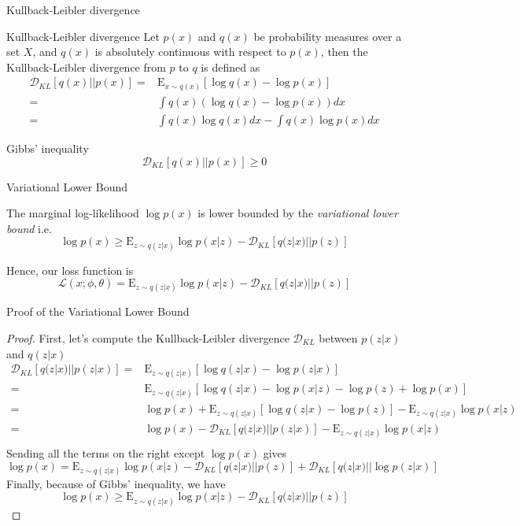 \documentclass{beamer}
\newcommand{\kldiv}{\mathcal{D}_{KL}}
\newcommand{\E}{\mathrm{E}}
\begin{document}
\begin{frame}{Kullback-Leibler divergence}

	\begin{block}{Kullback-Leibler divergence}
		Let $p(x)$ and $q(x)$ be probability measures over a set $X$, and $q(x)$ is absolutely continuous with respect to $p(x)$, then the Kullback-Leibler divergence from $p$ to $q$ is defined as
		\begin{equation*}
			\begin{split}
			\kldiv[q(x)||p(x)] 
			=& \E_{x\sim q(x)}[ \log q(x) - \log p(x)]\\
			=& \int q(x)(\log q(x)-\log p(x))dx\\
			=& \int q(x)\log q(x)dx-\int q(x)\log p(x)dx
			\end{split}
		\end{equation*}
	\end{block}
	\begin{block}{Gibbs' inequality}
		\begin{equation*}
			\kldiv[q(x)||p(x)] \geq 0
		\end{equation*} 
	\end{block}
\end{frame}

\begin{frame}{Variational Lower Bound}
	\begin{corollary}
		The marginal log-likelihood $\log p(x)$ is lower bounded by the \textit{variational lower bound} i.e.
		\[
			\log p(x)  \geq \E_{z\sim q(z|x)}\log p(x|z)- \kldiv[q(z|x)||p(z)]
		\]
	\end{corollary}
	Hence, our loss function is
	\Large
	\[
		\mathcal{L}(x;\phi, \theta) = \E_{z\sim q(z|x)}\log p(x|z)- \kldiv[q(z|x)||p(z)]
	\] 
\end{frame} 

\begin{frame}{Proof of the Variational Lower Bound}
	\begin{proof}
		\scriptsize
		First, let's compute the Kullback-Leibler divergence $\kldiv$ between $p(z|x)$ and $q(z|x)$
		\begin{equation*}
		\begin{split}
		\kldiv[q(z|x)||p(z|x)] 
		=& \E_{z\sim q(z|x)}[ \log q(z|x) - \log p(z|x)]\\
		=& \E_{z\sim q(z|x)}[ \log q(z|x) - \log p(x|z) - \log p(z) + \log p(x)]\\
		=& \log p(x) + \E_{z\sim q(z|x)}[ \log q(z|x)  - \log p(z)] - \E_{z\sim q(z|x)}\log p(x|z)\\
		=& \log p(x) - \kldiv[q(z|x)||p(z|x)] - \E_{z\sim q(z|x)}\log p(x|z)\\
		\end{split}
		\end{equation*}
		Sending all the terms on the right except $\log p(x)$ gives
		\[
			\log p(x) = \E_{z\sim q(z|x)}\log p(x|z)- \kldiv[q(z|x)||p(z)] + \kldiv[q(z|x)||\log p(z|x)]
		\]
		Finally, because of Gibbs' inequality, we have
		\[
			\boxed{\log p(x)  \geq \E_{z\sim q(z|x)}\log p(x|z)- \kldiv[q(z|x)||p(z)]}
		\]
	\end{proof}
\end{frame}
\end{document}
